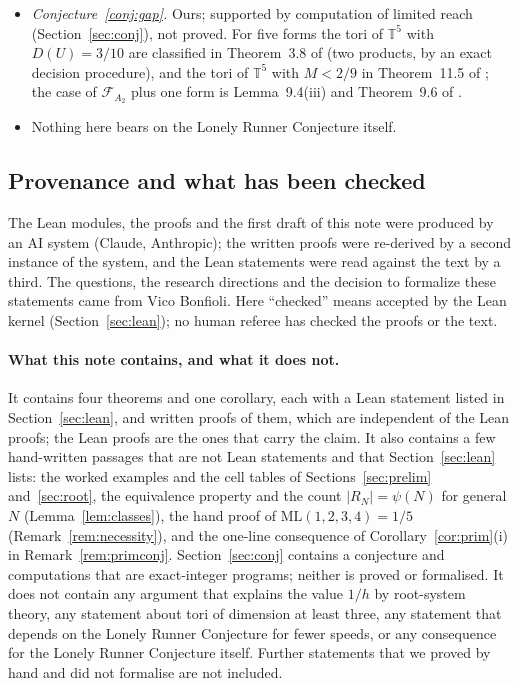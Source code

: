\documentclass[11pt]{amsart}
\theoremstyle{definition}
\theoremstyle{remark}
\newcommand{\T}{\mathbb{T}}
\newcommand{\ML}{\mathrm{ML}}
\begin{document}
\begin{itemize}[leftmargin=1.5em]
\item \emph{Conjecture~\ref{conj:gap}.} Ours; supported by computation of limited reach (Section~\ref{sec:conj}), not proved. For five forms the tori of $\T^5$ with $D(U)=3/10$ are classified in Theorem~3.8 of \cite{Cordella} (two products, by an exact decision procedure), and the tori of $\T^5$ with $M<2/9$ in Theorem~11.5 of \cite{YGB}; the case of $\mathcal F_{A_2}$ plus one form is Lemma~9.4(iii) and Theorem~9.6 of \cite{YGB}.
\item Nothing here bears on the Lonely Runner Conjecture itself.
\end{itemize}

\subsection{Provenance and what has been checked}
The Lean modules, the proofs and the first draft of this note were produced by an AI system (Claude, Anthropic); the written proofs were re-derived by a second instance of the system, and the Lean statements were read against the text by a third. The questions, the research directions and the decision to formalize these statements came from Vico Bonfioli. Here ``checked'' means accepted by the Lean kernel (Section~\ref{sec:lean}); no human referee has checked the proofs or the text.

\paragraph{What this note contains, and what it does not.}
It contains four theorems and one corollary, each with a Lean statement listed in Section~\ref{sec:lean}, and written proofs of them, which are independent of the Lean proofs; the Lean proofs are the ones that carry the claim. It also contains a few hand-written passages that are not Lean statements and that Section~\ref{sec:lean} lists: the worked examples and the cell tables of Sections~\ref{sec:prelim} and~\ref{sec:root}, the equivalence property and the count $|R_N|=\psi(N)$ for general $N$ (Lemma~\ref{lem:classes}), the hand proof of $\ML(1,2,3,4)=1/5$ (Remark~\ref{rem:necessity}), and the one-line consequence of Corollary~\ref{cor:prim}(i) in Remark~\ref{rem:primconj}. Section~\ref{sec:conj} contains a conjecture and computations that are exact-integer programs; neither is proved or formalised. It does not contain any argument that explains the value $1/h$ by root-system theory, any statement about tori of dimension at least three, any statement that depends on the Lonely Runner Conjecture for fewer speeds, or any consequence for the Lonely Runner Conjecture itself. Further statements that we proved by hand and did not formalise are not included.
\end{document}
